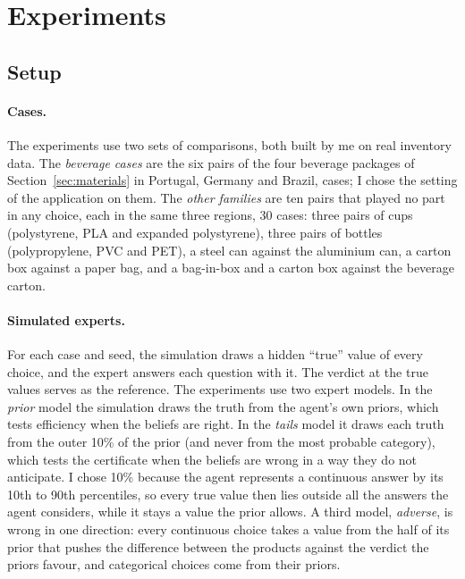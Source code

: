 \documentclass{article}
\begin{document}
\section{Experiments}\label{sec:experiments}

\subsection{Setup}

\paragraph{Cases.}
The experiments use two sets of comparisons, both built by me on real inventory data. The \emph{beverage
cases} are the six pairs of the four beverage packages of Section~\ref{sec:materials} in Portugal, Germany
and Brazil, \nCases{} cases; I chose the setting of the application on them. The \emph{other families} are
ten pairs that played no part in any choice, each in the same three regions, 30 cases: three pairs of cups
(polystyrene, PLA and expanded polystyrene), three pairs of bottles (polypropylene, PVC and PET), a steel
can against the aluminium can, a carton box against a paper bag, and a bag-in-box and a carton box against
the beverage carton.

\paragraph{Simulated experts.}
For each case and seed, the simulation draws a hidden ``true'' value of every choice, and the expert
answers each question with it. The verdict at the true values serves as the reference. The experiments
use two expert models. In the
\emph{prior} model the simulation draws the truth from the agent's own priors, which tests efficiency when
the beliefs are right. In the \emph{tails} model it draws each truth from the outer 10\% of the prior (and never from
the most probable category), which tests the certificate when the beliefs are wrong in a way they do not
anticipate. I chose 10\% because the agent represents a continuous answer by its 10th to 90th
percentiles, so every true value then lies outside all the answers the agent considers, while it stays a
value the prior allows. A third model, \emph{adverse}, is wrong in one direction: every continuous
choice takes a value from the half of its prior that pushes the difference between the products against the
verdict the priors favour, and categorical choices come from their priors.
\end{document}
